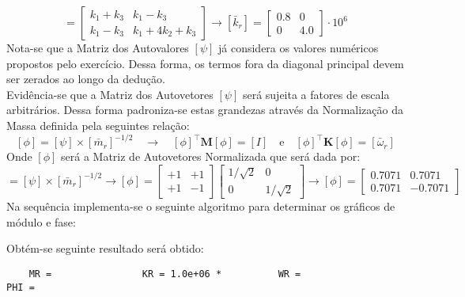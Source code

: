 \documentclass{article}
\begin{document}
\begin{resolution}
\begin{equation*}
    \end{equation*}
    \begin{equation*}
        [\bar{k}_r] = 
        \begin{bmatrix} k_1+k_3 & k_1-k_3\\ k_1-k_3 & k_1 + 4k_2 + k_3\end{bmatrix} \to 
        \boxed{[\bar{k}_r] = \begin{bmatrix} 0.8 & 0\\ 0 & 4.0\end{bmatrix}\cdot 10^6}
    \end{equation*}
    Nota-se que a Matriz dos Autovalores $[\psi]$ já considera os valores numéricos propostos pelo exercício. Dessa forma, os termos fora da diagonal principal devem ser zerados ao longo da dedução.\\

    Evidência-se que a Matriz dos Autovetores $[\psi]$ será sujeita a fatores de escala arbitrários. Dessa forma padroniza-se estas grandezas através da Normalização da Massa definida pela seguintes relação:
    \begin{equation}
        \boxed{[\phi] = [\psi] \times [\bar{m}_r]^{-1/2}}
        \quad \to \quad
        \boxed{[\phi]^\intercal \mathbf{M} [\phi] = [I]}
        \quad\text{e}\quad
        \boxed{[\phi]^\intercal \mathbf{K} [\phi] = [\bar{\omega}_r]}
    \end{equation}
    Onde $[\phi]$ será a Matriz de Autovetores Normalizada que será dada por:
    \begin{equation*}
        [\phi] = [\psi] \times [\bar{m}_r]^{-1/2}
        \to
        [\phi] = \begin{bmatrix} +1 & +1\\ +1 & -1\end{bmatrix} \begin{bmatrix} 1/\sqrt{2} & 0\\ 0 & 1/\sqrt{2}\end{bmatrix}
        \to 
        \boxed{[\phi] = \begin{bmatrix} 0.7071 & 0.7071\\ 0.7071 & -0.7071\end{bmatrix}}
    \end{equation*}
    Na sequência implementa-se o seguinte algoritmo para determinar os gráficos de módulo e fase:
    \begin{scriptsize}
        \myMatlab
    \end{scriptsize}
    Obtém-se seguinte resultado será obtido:
    \begin{scriptsize}
        \myMatlab\begin{lstlisting}
    MR =                KR = 1.0e+06 *          WR =                        PHI =


\end{lstlisting}
\end{scriptsize}
\end{resolution}
\end{document}
